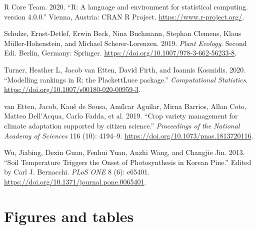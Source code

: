 \documentclass[
]{article}
\newlength{\cslhangindent}
\newenvironment{cslreferences}%
  {\setlength{\parindent}{0pt}%
  \everypar{\setlength{\hangindent}{\cslhangindent}}\ignorespaces}%
  {\par}
\begin{document}
\begin{cslreferences}
\leavevmode\hypertarget{ref-RCoreTeam}{}%
R Core Team. 2020. ``R: A language and environment for statistical
computing. version 4.0.0.'' Vienna, Austria: CRAN R Project.
\url{https://www.r-project.org/}.

\leavevmode\hypertarget{ref-PlantEcology}{}%
Schulze, Ernst-Detlef, Erwin Beck, Nina Buchmann, Stephan Clemens, Klaus
Müller-Hohenstein, and Michael Scherer-Lorenzen. 2019. \emph{Plant
Ecology}. Second Edi. Berlin, Germany: Springer.
\url{https://doi.org/10.1007/978-3-662-56233-8}.

\leavevmode\hypertarget{ref-Turner2020}{}%
Turner, Heather L, Jacob van Etten, David Firth, and Ioannis Kosmidis.
2020. ``Modelling rankings in R: the PlackettLuce package.''
\emph{Computational Statistics}.
\url{https://doi.org/10.1007/s00180-020-00959-3}.

\leavevmode\hypertarget{ref-vanEtten2019}{}%
van Etten, Jacob, Kauê de Sousa, Amílcar Aguilar, Mirna Barrios, Allan
Coto, Matteo Dell'Acqua, Carlo Fadda, et al. 2019. ``Crop variety
management for climate adaptation supported by citizen science.''
\emph{Proceedings of the National Academy of Sciences} 116 (10):
4194--9. \url{https://doi.org/10.1073/pnas.1813720116}.

\leavevmode\hypertarget{ref-JWu2013}{}%
Wu, Jiabing, Dexin Guan, Fenhui Yuan, Anzhi Wang, and Changjie Jin.
2013. ``Soil Temperature Triggers the Onset of Photosynthesis in Korean
Pine.'' Edited by Carl J. Bernacchi. \emph{PLoS ONE} 8 (6): e65401.
\url{https://doi.org/10.1371/journal.pone.0065401}.
\end{cslreferences}

\pagebreak

\hypertarget{figures-and-tables}{%
\section{Figures and tables}\label{figures-and-tables}}
\end{document}
